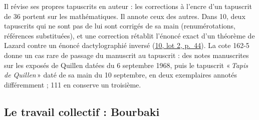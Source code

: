 \documentclass[11pt]{amsart}
\makeatletter
\newcommand{\q}[1]{«\,\textit{#1}\,»}
\def\RHM@first#1--#2\@nil{#1}
\DeclareRobustCommand{\lot}[3]{\begingroup\edef\RHM@pdfpage{\the\numexpr\RHM@first#3--\@nil+1\relax}\href{https://grothendieck.umontpellier.fr/#1.pdf\#page=\RHM@pdfpage}{#1, lot #2, p.~#3}\endgroup}
\newcommand{\lot}[3]{\href{https://grothendieck.commutator.io/\##1/#2/p#3}{#1, lot #2, p.~#3}}
\makeatother
\begin{document}
Il révise ses propres tapuscrits en auteur : les corrections à l'encre d'un tapuscrit de 36 portent sur les mathématiques. Il annote ceux des autres. Dans 10, deux tapuscrits qui ne sont pas de lui sont corrigés de sa main (renumérotations, références substituées), et une correction rétablit l'énoncé exact d'un théorème de Lazard contre un énoncé dactylographié inversé (\lot{10}{2}{44}). La cote 162-5 donne un cas rare de passage du manuscrit au tapuscrit : des notes manuscrites sur les exposés de Quillen datées du 6 septembre 1968, puis le tapuscrit \q{Tapis de Quillen} daté de sa main du 10 septembre, en deux exemplaires annotés différemment ; 111 en conserve un troisième.

\subsection{Le travail collectif : Bourbaki}\label{sub:bourbaki}
\end{document}
